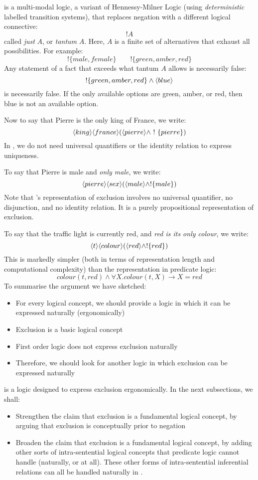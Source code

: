 \ELFULL{} is a multi-modal logic, a variant of Hennessy-Milner Logic (using \emph{deterministic} labelled transition systems), that replaces negation with a different logical connective:
\[
   !A
\]
called \emph{just} $A$, or \emph{tantum} $A$.
Here, $A$ is a finite set of alternatives that exhaust all
possibilities. 
For example:
\[
   !\{male, female\}
      \qquad
   !\{green, amber, red\}
\]
Any statement of a fact that exceeds what tantum $A$ allows is necessarily false:
\[
   !\{green, amber, red\} \land \langle blue \rangle \]
is necessarily false.
If the only available options are green, amber, or red, then blue is not an available option.

Now to say that Pierre is the only king of France, we write:
\[
\langle king \rangle \langle france \rangle (\langle pierre \rangle \land \ ! \  \{pierre\})
\]
In \ELFULL{}, we do not need universal quantifiers or the identity relation to express uniqueness.

To say that Pierre is male and \emph{only male}, we write:
\[
\langle pierre \rangle \langle sex \rangle (\langle male \rangle \land !\{male\})
\]
Note that \ELFULL{}'s representation of exclusion involves no universal quantifier, no disjunction, and no identity relation.
It is a purely propositional representation of exclusion.

To say that the traffic light is currently red, and \emph{red is its only colour}, we write:
\[
\langle t \rangle \langle colour \rangle (\langle red \rangle \land !\{red\})
\]
This is markedly simpler (both in terms of representation length and computational complexity) than the representation in predicate logic:
\[
colour(t, red) \land \forall X . colour(t, X) \rightarrow X = red
\]
To summarise the argument we have sketched:
\begin{itemize}
\item
For every logical concept, we should provide a logic in which it can be expressed naturally (ergonomically)
\item
Exclusion is a basic logical concept
\item
First order logic does not express exclusion naturally
\item
Therefore, we should look for another logic in which exclusion can be expressed naturally
\end{itemize}
\ELFULL{} is a logic designed to express exclusion ergonomically.
In the next subsections, we shall:
\begin{itemize}
\item
Strengthen the claim that exclusion is a fundamental logical concept, by arguing that exclusion is conceptually prior to negation
\item
Broaden the claim that exclusion is a fundamental logical concept, by adding other sorts of intra-sentential logical concepts that predicate logic cannot handle (naturally, or at all). These other forms of intra-sentential inferential relations can all be handled naturally in \ELFULL{}.
\end{itemize}

